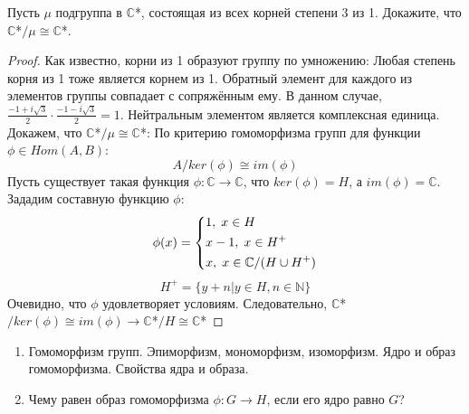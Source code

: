\begin{problem}
	Пусть $\mu$ подгруппа в $\mathbb {C}$*, состоящая из всех корней степени 3 из 1. Докажите, что $\mathbb {C}$*$/\mu\cong\mathbb {C}$*.
\end{problem}

\begin{proof}
	Как известно, корни из 1 образуют группу по умножению:
	\newline
	Любая степень корня из 1 тоже является корнем из 1.
	\newline
	Обратный элемент для каждого из элементов группы совпадает с сопряжённым ему. В данном случае, $\frac{-1+i\sqrt{3}}{2}\cdot\frac{-1-i\sqrt{3}}{2}=1$.
	\newline
	Нейтральным элементом является комплексная единица.
	\newline
	Докажем, что $\mathbb {C}$*$/\mu\cong\mathbb {C}$*:
	\newline
	По критерию гомоморфизма групп для функции $\phi \in Hom(A, B)$:
	\[
		A/ker(\phi)\cong im(\phi)
	\]
	Пусть существует такая функция $\phi:\mathbb {C}\rightarrow\mathbb {C}$, что $ker(\phi)=H$, а $im(\phi)=\mathbb {C}$.
	\newline
	Зададим составную функцию $\phi$:
	\[
		\phi(x)=
		\begin{dcases}
			1,\;x\in H\\
			x-1,\;x\in H^+\\
			x,\;x\in\mathbb {C}/(H\cup H^+)
		\end{dcases}
	\]
	\[
		H^+=\{y+n|y\in H,n\in\mathbb {N}\}
	\]
	Очевидно, что $\phi$ удовлетворяет условиям. Следовательно, $\mathbb {C}$*$/ker(\phi)\cong im(\phi)\rightarrow\mathbb {C}$*$/H\cong\mathbb {C}$*
\end{proof}

\begin{problem}
	\begin{minipage}[t]{\linegoal}
		\begin{enumerate}[label=(\alph*), leftmargin=*]
			\item Гомоморфизм групп. Эпиморфизм, мономорфизм, изоморфизм. Ядро и образ гомоморфизма. Свойства ядра и образа.
			\item Чему равен образ гомоморфизма $\phi:G\rightarrow H$, если его ядро равно $G$?
		\end{enumerate}
	\end{minipage}
\end{problem}

